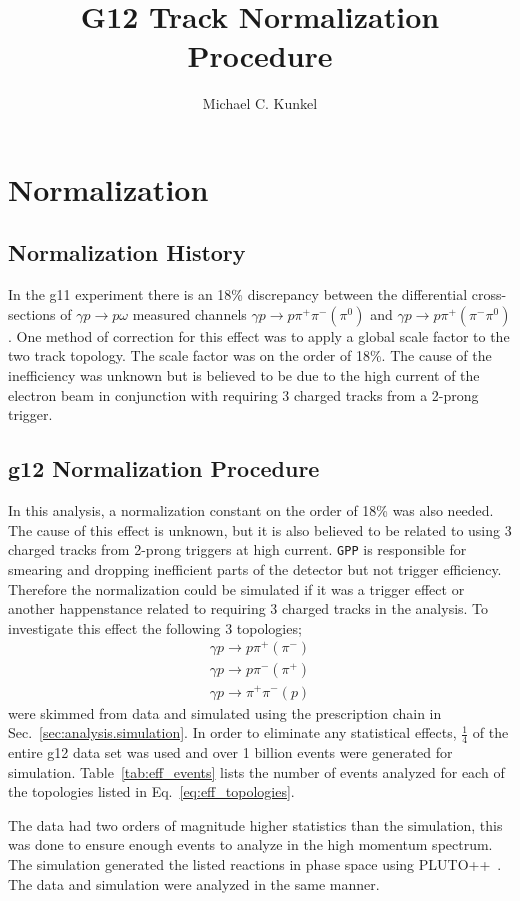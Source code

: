 \documentclass[11pt,a4paper]{article}
\author{Michael C. Kunkel}
\title{G12 Track Normalization Procedure}
\newcommand{\abbr}[1]{\textsc{\texttt{#1}}}
\begin{document}
	\maketitle
	\section{Normalization}\label{sec:results.normalization}
	\subsection{Normalization History}
	In the g11 experiment there is an 18\% discrepancy between the differential cross-sections of $\gamma p \rightarrow p \omega$ measured channels $\gamma p \rightarrow p \pi^+ \pi^- (\pi^0)$ and $\gamma p \rightarrow p \pi^+ (\pi^- \pi^0)$. 
	One method of correction for this effect was to apply a global scale factor to the two track topology. The scale factor was on the order of 18\%. The cause of the inefficiency was unknown but is believed to be due to the high current of 
	the electron beam in conjunction with requiring 3 charged tracks from a 2-prong trigger.
	\subsection{g12 Normalization Procedure}\label{sec:results.g12normalization}
	In this analysis, a normalization constant on the order of 18\% was also needed. The cause of this effect is unknown, but it is also believed to be related to using 3 charged tracks from 2-prong triggers at high current. \abbr{GPP} is responsible for smearing and dropping inefficient parts of the detector but not trigger efficiency. Therefore the normalization could be simulated if it was a trigger effect or another happenstance related to requiring 3 charged tracks in the analysis. To investigate this effect the following 3 topologies; 
	\begin{align}\label{eq:eff_topologies}
		\gamma p \rightarrow p \pi^+ (\pi^-) \nonumber\\
		\gamma p \rightarrow p \pi^- (\pi^+)  \nonumber\\
		\gamma p \rightarrow \pi^+ \pi^- (p)
	\end{align}  
	were skimmed from data and simulated using the prescription chain in Sec.~\ref{sec:analysis.simulation}. In order to eliminate any statistical effects, $\frac{1}{4}$ of the entire g12 data set was used and over 1 billion events were generated for simulation. Table~\ref{tab:eff_events} lists the number of events analyzed for each of the topologies listed in Eq.~\ref{eq:eff_topologies}.
	
	The data had two orders of magnitude higher statistics than the simulation, this was done to ensure enough events to analyze in the high momentum spectrum. The simulation generated the listed reactions in phase space using PLUTO++~\cite{PLUTO}. The data and simulation were analyzed in the same manner.
	
\end{document}
